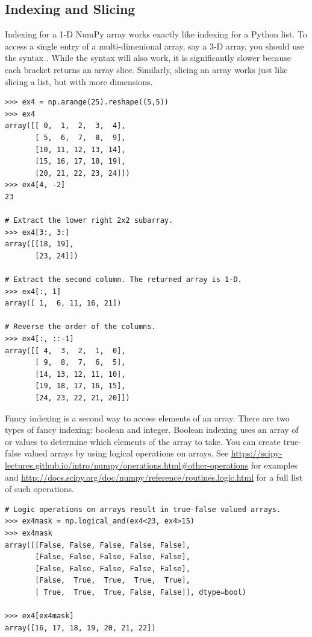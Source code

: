 \subsection*{Indexing and Slicing} 
Indexing for a 1-D NumPy array works exactly like indexing for a Python list. 
To access a single entry of a multi-dimenional array, say a 3-D array, you should use the syntax . 
While the syntax  will also work, it is significantly slower because each bracket returns an array slice. 
Similarly, slicing an array works just like slicing a list, but with more dimensions.
\begin{lstlisting}
>>> ex4 = np.arange(25).reshape((5,5)) 
>>> ex4
array([[ 0,  1,  2,  3,  4],
       [ 5,  6,  7,  8,  9],
       [10, 11, 12, 13, 14],
       [15, 16, 17, 18, 19],
       [20, 21, 22, 23, 24]])
>>> ex4[4, -2]
23

# Extract the lower right 2x2 subarray.
>>> ex4[3:, 3:] 
array([[18, 19],
       [23, 24]])
       
# Extract the second column. The returned array is 1-D.
>>> ex4[:, 1] 
array([ 1,  6, 11, 16, 21]) 

# Reverse the order of the columns.
>>> ex4[:, ::-1] 
array([[ 4,  3,  2,  1,  0],
       [ 9,  8,  7,  6,  5],
       [14, 13, 12, 11, 10],
       [19, 18, 17, 16, 15],
       [24, 23, 22, 21, 20]])
\end{lstlisting}

Fancy indexing is a second way to access elements of an array. 
There are two types of fancy indexing: boolean and integer. 
Boolean indexing uses an array of  or  values to 
determine which elements of the array to take. 
You can create true-false valued arrays by using logical operations on arrays. 
See \url{https://scipy-lectures.github.io/intro/numpy/operations.html#other-operations} for examples and \url{http://docs.scipy.org/doc/numpy/reference/routines.logic.html} for a full list of such operations.



\begin{lstlisting}
# Logic operations on arrays result in true-false valued arrays.
>>> ex4mask = np.logical_and(ex4<23, ex4>15)
>>> ex4mask 
array([[False, False, False, False, False],
       [False, False, False, False, False],
       [False, False, False, False, False],
       [False,  True,  True,  True,  True],
       [ True,  True,  True, False, False]], dtype=bool)

>>> ex4[ex4mask]
array([16, 17, 18, 19, 20, 21, 22])
\end{lstlisting}

